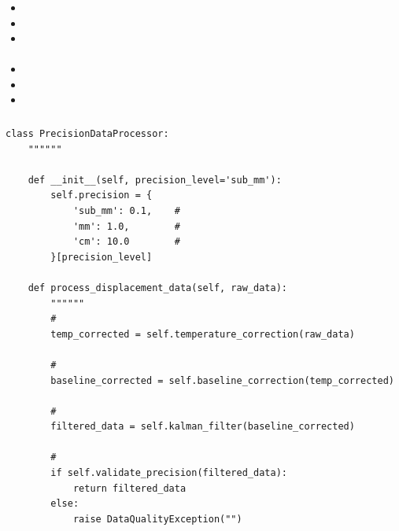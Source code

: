 \hypertarget{section-53}{%
\subsubsection{}\label{section-53}}

\hypertarget{section-54}{%
\paragraph{}\label{section-54}}

\begin{itemize}
\item
  \important{}
\item
  \important{}
\item
  \important{}
\end{itemize}

\hypertarget{section-55}{%
\paragraph{}\label{section-55}}

\begin{itemize}
\item
  \important{}
\item
  \important{}
\item
  \important{}
\end{itemize}

\hypertarget{section-56}{%
\subsubsection{}\label{section-56}}

\hypertarget{section-57}{%
\paragraph{}\label{section-57}}

\begin{lstlisting}[style=python]
class PrecisionDataProcessor:
    """"""
    
    def __init__(self, precision_level='sub_mm'):
        self.precision = {
            'sub_mm': 0.1,    # 
            'mm': 1.0,        # 
            'cm': 10.0        # 
        }[precision_level]
    
    def process_displacement_data(self, raw_data):
        """"""
        # 
        temp_corrected = self.temperature_correction(raw_data)
        
        # 
        baseline_corrected = self.baseline_correction(temp_corrected)
        
        # 
        filtered_data = self.kalman_filter(baseline_corrected)
        
        # 
        if self.validate_precision(filtered_data):
            return filtered_data
        else:
            raise DataQualityException("")
\end{lstlisting}

